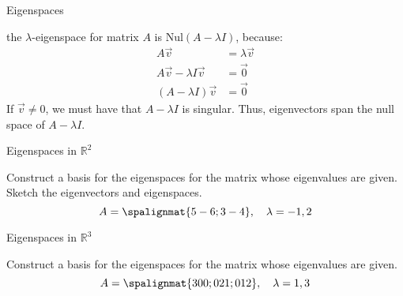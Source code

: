 \begin{frame}{Eigenspaces}

    \begin{center}\end{center}

    \vspace{2pt} 

     the $\lambda$-eigenspace for matrix $A$ is $\textrm{Nul} (A-\lambda I)$, because: \pause 
    \begin{align*}
        A \vec v & = \lambda \vec v \\
        A \vec v - \lambda I \vec v & = \vec 0 \\
        (A - \lambda I) \vec v &= \vec 0
    \end{align*}
    \pause If $\vec v \ne 0$, we must have that $A - \lambda I$ is singular. \pause Thus, eigenvectors span the null space of $A - \lambda I$. 
\end{frame}



\begin{frame}{Eigenspaces in $\mathbb R^2$}

    Construct a basis for the eigenspaces for the matrix whose eigenvalues are given. Sketch the eigenvectors and eigenspaces. $$A = \spalignmat{ 5 -6; 3 -4}, \quad \lambda = -1, 2$$

\end{frame}



\begin{frame}{Eigenspaces in $\mathbb R^3$}

    Construct a basis for the eigenspaces for the matrix whose eigenvalues are given. $$A= \spalignmat{ 3 0 0;0 2 1;0 1 2}, \quad \lambda = 1, 3$$

\end{frame}




